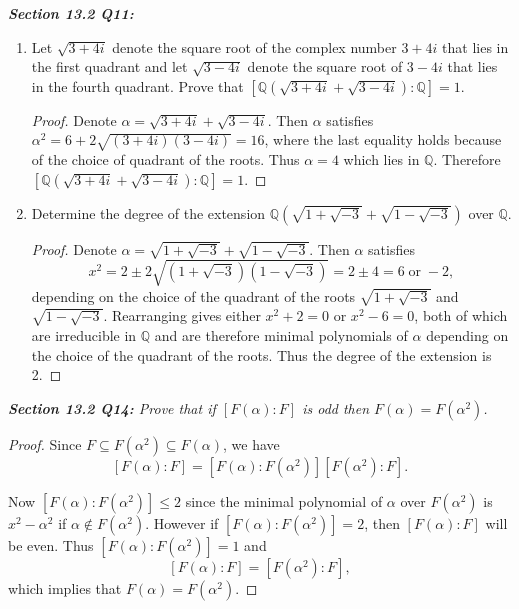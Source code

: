 \documentclass{article}
\begin{document}
\it \textbf{Section 13.2 Q11:}
  \begin{enumerate}[label={(\alph*)}]
    \item Let $\sqrt{3+4i}$ denote the square root of the complex number
      $3+4i$ that lies in the first quadrant and let $\sqrt{3-4i}$ denote
      the square root of $3-4i$ that lies in the fourth quadrant. Prove
      that $[\mathbb{Q}(\sqrt{3+4i}+\sqrt{3-4i}):\mathbb{Q}]=1$.

      \begin{proof}
        Denote $\alpha=\sqrt{3+4i}+\sqrt{3-4i}$. Then $\alpha$ satisfies
        $\alpha^2=6+2\sqrt{(3+4i)(3-4i)}=16$, where the last equality holds
        because of the choice of quadrant of the roots. Thus $\alpha=4$
        which lies in $\mathbb{Q}$. Therefore
        $[\mathbb{Q}(\sqrt{3+4i}+\sqrt{3-4i}):\mathbb{Q}]=1$.
      \end{proof}

    \item Determine the degree of the extension
      $\mathbb{Q}(\sqrt{1+\sqrt{-3}} +\sqrt{1-\sqrt{-3}})$ over
      $\mathbb{Q}$.

      \begin{proof}
        Denote $\alpha=\sqrt{1+\sqrt{-3}} +\sqrt{1-\sqrt{-3}}$. Then
        $\alpha$ satisfies
        \[x^2 =2\pm 2\sqrt{(1+\sqrt{-3})(1-\sqrt{-3})} =2\pm 4 =6\;
        \text{or}\; -2,\]
        depending on the choice of the quadrant of the roots
        $\sqrt{1+\sqrt{-3}}$ and $\sqrt{1-\sqrt{-3}}$. Rearranging gives
        either $x^2+2=0$ or $x^2-6=0$, both of which are irreducible in
        $\mathbb{Q}$ and are therefore minimal polynomials of $\alpha$
        depending on the choice of the quadrant of the roots. Thus the
        degree of the extension is 2.
      \end{proof}
  \end{enumerate}

\it \textbf{Section 13.2 Q14:} Prove that if $[F(\alpha):F]$ is odd then
  $F(\alpha)=F(\alpha^2)$.

  \begin{proof}
    Since $F\subseteq F(\alpha^2) \subseteq F(\alpha)$, we have
    \[[F(\alpha):F] =[F(\alpha):F(\alpha^2)] [F(\alpha^2):F].\]

    Now $[F(\alpha):F(\alpha^2)]\leq2$ since the minimal polynomial of
    $\alpha$ over $F(\alpha^2)$ is $x^2-\alpha^2$ if $\alpha\not\in
    F(\alpha^2)$. However if $[F(\alpha):F(\alpha^2)]=2$, then
    $[F(\alpha):F]$ will be even. Thus $[F(\alpha):F(\alpha^2)]=1$ and
    \[[F(\alpha):F] =[F(\alpha^2):F],\]
    which implies that $F(\alpha)=F(\alpha^2)$.
  \end{proof}
\end{document}
